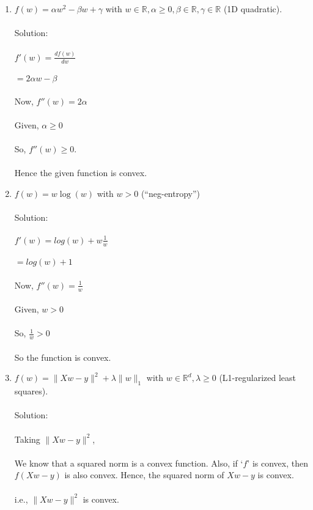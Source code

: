 \documentclass{article}
\def\blu#1{{\color{blu}#1}}
\def\norm#1{\|#1\|}
\def\R{\mathbb{R}}
\def\enum#1{\begin{enumerate}#1\end{enumerate}}
\begin{document}
\enum{
\item $f(w) = \alpha w^2 - \beta w + \gamma$ with $w \in \R, \alpha \geq 0, \beta \in \R, \gamma \in \R$ (1D quadratic). \\ \\
\blu{Solution: \\ \\
$f'(w) = \frac{df(w)}{dw}$ \\ \\
$ = 2 \alpha w - \beta$ \\ \\
Now, $f''(w) = 2 \alpha$ \\ \\
Given, $\alpha \geq 0$ \\ \\
So, $f''(w) \geq 0$. \\ \\
Hence the given function is convex. }
\item $f(w) = w\log(w) $ with $w > 0$ (``neg-entropy'') \\ \\
\blu{Solution: \\ \\
$f'(w) = log(w) + w\frac{1}{w}$ \\ \\
$= log(w) + 1 $ \\ \\
Now, $f''(w) = \frac{1}{w}$ \\ \\
Given, $w > 0$ \\ \\
So, $\frac{1}{w} > 0$ \\ \\
So the function is convex.} \\
\item $f(w) = \norm{Xw-y}^2 + \lambda\norm{w}_1$ with $w \in \R^d, \lambda \geq 0$ (L1-regularized least squares). \\ \\
\blu{Solution: \\ \\
Taking $\norm{Xw-y}^2$, \\ \\
We know that a squared norm is a convex function. 
Also, if `$f$' is convex, then $f(Xw-y)$ is also convex. Hence, the squared norm of $Xw - y$ is convex. \\ \\
i.e.,  $\norm{Xw-y}^2$ is convex. \\ \\
}}
\end{document}
